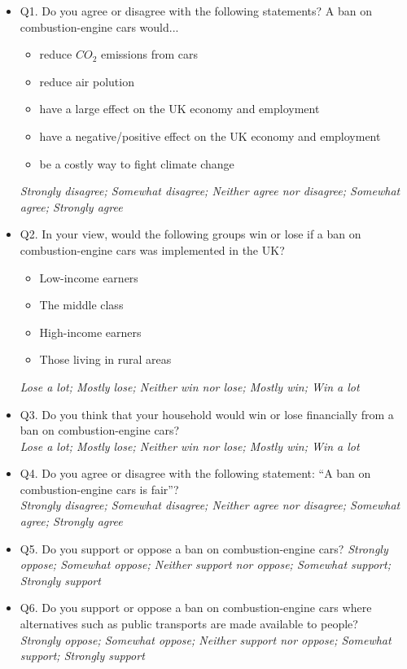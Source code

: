 \documentclass{article}
\begin{document}
\begin{itemize}
    \item Q1. Do you agree or disagree with the following statements? A ban on combustion-engine cars would...
    \begin{itemize}
        \item reduce $CO_2$ emissions from cars
        \item reduce air polution
        \item have a large effect on the UK economy and employment
        \item have a negative/positive effect on the UK economy and employment
        \item be a costly way to fight climate change
    \end{itemize}
    \textit{Strongly disagree; Somewhat disagree; Neither agree nor disagree; Somewhat agree; Strongly agree}
    \item Q2. In your view, would the following groups win or lose if a ban on combustion-engine cars was implemented in the UK?
    \begin{itemize}
    \item Low-income earners
    \item The middle class
    \item High-income earners
    \item Those living in rural areas
    \end{itemize}
    \textit{Lose a lot; Mostly lose; Neither win nor lose; Mostly win; Win a lot}
    \item Q3. Do you think that your household would win or lose financially from a ban on combustion-engine cars?  \\
    \textit{Lose a lot; Mostly lose; Neither win nor lose; Mostly win; Win a lot}
    \item Q4. Do you agree or disagree with the following statement: ``A ban on combustion-engine cars is fair''? \\
    \textit{Strongly disagree; Somewhat disagree; Neither agree nor disagree; Somewhat agree; Strongly agree}
    \item Q5. Do you support or oppose a ban on combustion-engine cars?
    \textit{Strongly oppose; Somewhat oppose; Neither support nor oppose; Somewhat support; Strongly support}
    \item Q6. Do you support or oppose a ban on combustion-engine cars where alternatives such as public transports are made available to people? \\
    \textit{Strongly oppose; Somewhat oppose; Neither support nor oppose; Somewhat support; Strongly support}
\end{itemize}
\end{document}
